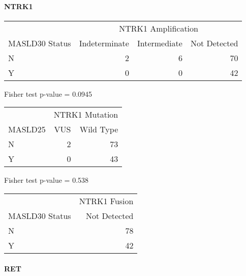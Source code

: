 \documentclass[
]{article}
\begin{document}
\hypertarget{ntrk1}{%
\paragraph{NTRK1}\label{ntrk1}}

\begingroup
\fontsize{12.0pt}{14.4pt}\selectfont
\setlength{\LTpost}{0mm}
\begin{longtable}{l|rrr}
\toprule
 & \multicolumn{3}{c}{NTRK1 Amplification} \\ 
\cmidrule(lr){2-4}
MASLD30 Status & Indeterminate & Intermediate & Not Detected \\ 
\midrule\addlinespace[2.5pt]
N & 2 & 6 & 70 \\ 
Y & 0 & 0 & 42 \\ 
\bottomrule
\end{longtable}
\begin{minipage}{\linewidth}
Fisher test p-value =  0.0945\\
\end{minipage}
\endgroup

\begingroup
\fontsize{12.0pt}{14.4pt}\selectfont
\setlength{\LTpost}{0mm}
\begin{longtable}{lrr}
\toprule
 & \multicolumn{2}{c}{NTRK1 Mutation} \\ 
\cmidrule(lr){2-3}
MASLD25 & VUS & Wild Type \\ 
\midrule\addlinespace[2.5pt]
N & 2 & 73 \\ 
Y & 0 & 43 \\ 
\bottomrule
\end{longtable}
\begin{minipage}{\linewidth}
Fisher test p-value =  0.538\\
\end{minipage}
\endgroup

\begingroup
\fontsize{12.0pt}{14.4pt}\selectfont
\begin{longtable}{l|r}
\toprule
 & NTRK1 Fusion \\ 
\cmidrule(lr){2-2}
MASLD30 Status & Not Detected \\ 
\midrule\addlinespace[2.5pt]
N & 78 \\ 
Y & 42 \\ 
\bottomrule
\end{longtable}
\endgroup
\pagebreak

\hypertarget{ret}{%
\paragraph{RET}\label{ret}}
\end{document}
